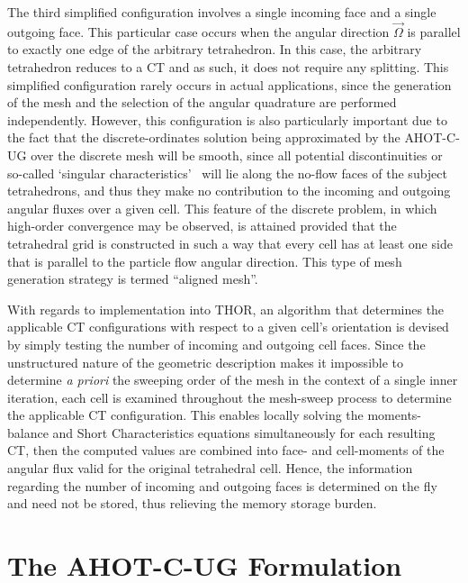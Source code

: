 The third simplified configuration involves a single incoming face and a single outgoing face.
This particular case occurs when the angular direction $\vec{\Omega}$ is parallel to exactly one edge of the arbitrary tetrahedron.
In this case, the arbitrary tetrahedron reduces to a \ac{CT} and as such, it does not require any splitting.
This simplified configuration rarely occurs in actual applications, since the generation of the mesh and the selection of the angular quadrature are performed independently.
However, this configuration is also particularly important due to the fact that the discrete-ordinates solution being approximated by the \ac{AHOT-C-UG} over the discrete mesh will be smooth, since all potential discontinuities or so-called `singular characteristics'~\cite{Duo2009} will lie along the no-flow faces of the subject tetrahedrons, and thus they make no contribution to the incoming and outgoing angular fluxes over a given cell.
This feature of the discrete problem, in which high-order convergence may be observed, is attained provided that the tetrahedral grid is constructed in such a way that every cell has at least one side that is parallel to the particle flow angular direction.
This type of mesh generation strategy is termed ``aligned mesh''.

With regards to implementation into \ac{THOR}, an algorithm that determines the applicable \ac{CT} configurations with respect to a given cell's orientation is devised by simply testing the number of incoming and outgoing cell faces.
Since the unstructured nature of the geometric description makes it impossible to determine \textit{a priori} the sweeping order of the mesh in the context of a single inner iteration, each cell is examined throughout the mesh-sweep process to determine the applicable \ac{CT} configuration.
This enables locally solving the moments-balance and Short Characteristics equations simultaneously for each resulting \ac{CT}, then the computed values are combined into face- and cell-moments of the angular flux valid for the original tetrahedral cell.
Hence, the information regarding the number of incoming and outgoing faces is determined on the fly and need not be stored, thus relieving the memory storage burden.

\section{The \ac{AHOT-C-UG} Formulation}

